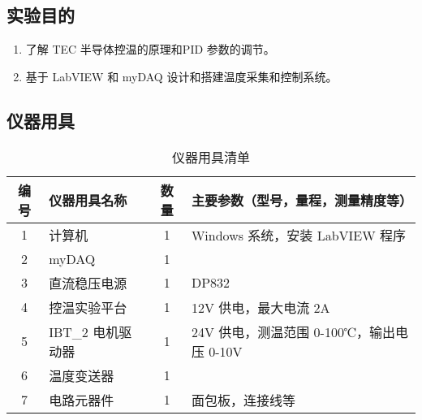 \documentclass[dvipsnames, svgnames,a4paper,11pt]{article}
\begin{document}
	\subsection{实验目的}
		\begin{enumerate}
			\item 了解 TEC 半导体控温的原理和PID 参数的调节。
			\item 基于 LabVIEW 和 myDAQ 设计和搭建温度采集和控制系统。
			
			
		\end{enumerate}
	
	\subsection{仪器用具}
	\begin{table}[h!]
		\centering
		\begin{tabular}{|c|m{4cm}|c|m{8cm}|}
		\hline
		编号 & 仪器用具名称 & 数量 & 主要参数（型号，量程，测量精度等） \\ 
		\hline
		1 & 计算机 & 1 & Windows 系统，安装 LabVIEW 程序 \\ 
		\hline
		2 & myDAQ & 1 &  \\ 
		\hline
		3 & 直流稳压电源 & 1 & DP832 \\ 
		\hline
		4 & 控温实验平台 & 1 & 12V 供电，最大电流 2A \\ 
		\hline
		5 & IBT\_2 电机驱动器 & 1 & 24V 供电，测温范围 0-100℃，输出电压 0-10V \\ 
		\hline
		6 & 温度变送器 & 1 &  \\ 
		\hline
		7 & 电路元器件 & 1 & 面包板，连接线等 \\ 
		\hline
		\end{tabular}
		\caption{仪器用具清单}
		\end{table}
	
\end{document}
